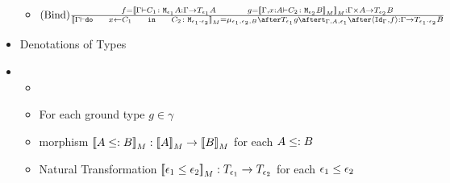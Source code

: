 \documentclass{report}
\begin{document}
\begin{itemize}
\begin{itemize}
        \item $\treerule{Bind}{f = \deno{\typerelation{\G}{C_1}{\M{\e_1}{A}} : \G \rightarrow \T{\e_1}{A}\s\s g = \deno{\typerelation{\gax}{C_2}{\M{\e_2}{B}}}}: \G \times A \rightarrow \T{\e_2}{B}}{\deno{\typerelation{\G}{\doin{x}{C_1}{C_2}}{\M{\e_1 \cdot \e_2}}} = \bind{\e_1}{\e_2}{B} \after \T{\e_1}{g} \after \tstrength{\G}{A}{\e_1} \after \pr{\Id{\G}}{f}: \G \rightarrow \T{\e_1 \cdot \e_2}{B}}$
    \end{itemize}
    \item Denotations of Types
    \item \begin{itemize}
        \item  {}
        \item For each ground type $g \in \gamma$
        \item morphism ${\bf [\![}A \leq: B{\bf ]\!]}_M : {\bf [\![}A{\bf ]\!]}_M \rightarrow {\bf [\![}B{\bf ]\!]}_M$ for each $A \leq: B$
        \item Natural Transformation ${\bf [\![}\epsilon_1 \leq \epsilon_2{\bf ]\!]}_M: T_{\epsilon_1}{} \rightarrow T_{\epsilon_2}{}$ for each $\epsilon_1 \leq \epsilon_2$
    \end{itemize}
    
\end{itemize}
    
\end{document}
